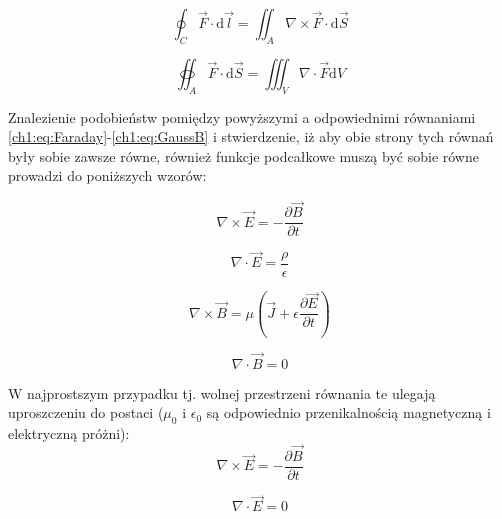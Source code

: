\begin{equation}
\oint_C\vec{F}\cdot\mathrm{d}\vec{l} = \iint_A\nabla\times\vec{F}\cdot\mathrm{d}\vec{S}
\label{ch1:eq:StokesTheorem}
\end{equation}

\begin{equation}
\oiint_A\vec{F}\cdot\mathrm{d}\vec{S} = \iiint_V\nabla\cdot\vec{F}\mathrm{d}V
\label{ch1:eq:GaussTheorem}
\end{equation}

Znalezienie podobieństw pomiędzy powyższymi a odpowiednimi równaniami \eqref{ch1:eq:Faraday}-\eqref{ch1:eq:GaussB} i stwierdzenie, iż aby obie strony tych równań były sobie zawsze równe, również funkcje podcałkowe muszą być sobie równe prowadzi do poniższych wzorów:


\begin{equation}
\nabla\times\vec{E} = -\frac{\partial\vec{B}}{\partial t}
\label{ch1:eq:FaradayDiff}
\end{equation}

\begin{equation}
\nabla\cdot\vec{E} = \frac{\rho}{\epsilon}
\label{ch1:eq:GaussDiff}
\end{equation}

\begin{equation}
\nabla\times\vec{B} = \mu\left(\vec{J} + \epsilon\frac{\partial\vec{E}}{\partial t} \right)
\label{ch1:eq:AmpereDiff}
\end{equation}

\begin{equation}
\nabla\cdot\vec{B} = 0
\label{ch1:eq:GaussBDiff}
\end{equation}

W najprostszym przypadku tj. wolnej przestrzeni równania te ulegają uproszczeniu do postaci ($\mu_0$ i $\epsilon_0$ są odpowiednio przenikalnością magnetyczną i elektryczną próżni):
\begin{equation}
\nabla\times\vec{E} = -\frac{\partial\vec{B}}{\partial t}
\label{ch1:eq:FaradayDiffFree}
\end{equation}

\begin{equation}
\nabla\cdot\vec{E} = 0
\label{ch1:eq:GaussDiffFree}
\end{equation}

